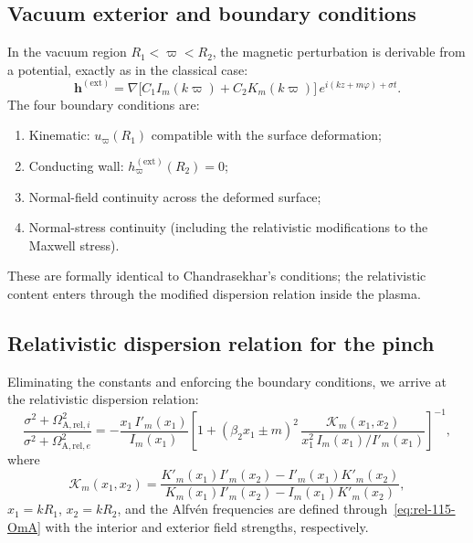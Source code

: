 \subsection{Vacuum exterior and boundary conditions}
\label{sec:rel-115-bc}

In the vacuum region $R_{1} < \varpi < R_{2}$, the magnetic
perturbation is derivable from a potential, exactly as in the
classical case:
\begin{equation}
\label{eq:rel-115-hext}
\mathbf{h}^{(\mathrm{ext})}
  = \nabla\bigl[C_{1}I_{m}(k\varpi)+C_{2}K_{m}(k\varpi)\bigr]\,
    e^{i(kz+m\varphi)+\sigma t}.
\end{equation}
The four boundary conditions are:
\begin{enumerate}
\item Kinematic: $u_{\varpi}(R_{1})$ compatible with the surface
  deformation;
\item Conducting wall: $h_{\varpi}^{(\mathrm{ext})}(R_{2}) = 0$;
\item Normal-field continuity across the deformed surface;
\item Normal-stress continuity (including the relativistic
  modifications to the Maxwell stress).
\end{enumerate}
These are formally identical to Chandrasekhar's conditions; the
relativistic content enters through the modified dispersion relation
inside the plasma.

\subsection{Relativistic dispersion relation for the pinch}
\label{sec:rel-115-disp}

Eliminating the constants and enforcing the boundary conditions, we
arrive at the relativistic dispersion relation:
\begin{equation}
\label{eq:rel-115-DR}
\boxed{
\frac{\sigma^{2} + \Omega_{\mathrm{A,rel},i}^{2}}
  {\sigma^{2} + \Omega_{\mathrm{A,rel},e}^{2}}
  = -\frac{x_{1}\,I'_{m}(x_{1})}{I_{m}(x_{1})}
  \left[
    1 + (\beta_{2}x_{1}\pm m)^{2}\,
    \frac{\mathcal{K}_{m}(x_{1},x_{2})}
      {x_{1}^{2}\,I_{m}(x_{1})/I'_{m}(x_{1})}
  \right]^{-1},
}
\end{equation}
where
\begin{equation}
\label{eq:rel-115-Km}
\mathcal{K}_{m}(x_{1},x_{2})
  = \frac{K'_{m}(x_{1})I'_{m}(x_{2})-I'_{m}(x_{1})K'_{m}(x_{2})}
    {K_{m}(x_{1})I'_{m}(x_{2})-I_{m}(x_{1})K'_{m}(x_{2})},
\end{equation}
$x_{1} = kR_{1}$, $x_{2} = kR_{2}$, and the Alfv\'en frequencies
are defined through~\eqref{eq:rel-115-OmA} with the interior and
exterior field strengths, respectively.

